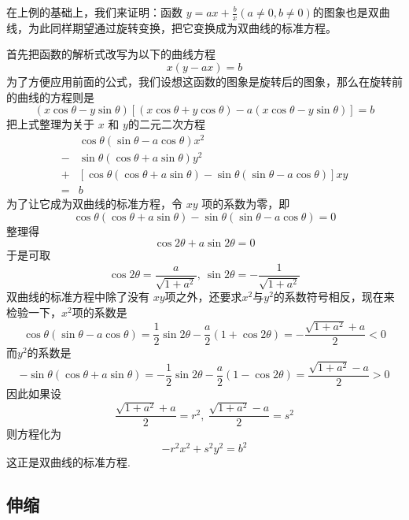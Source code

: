 \begin{example}
  在上例的基础上，我们来证明：函数 $y=ax+\frac{b}{x}(a \neq 0, b \neq 0)$的图象也是双曲线，为此同样期望通过旋转变换，把它变换成为双曲线的标准方程。

  首先把函数的解析式改写为以下的曲线方程
  \[ x(y-ax)=b \]
  为了方便应用前面的公式，我们设想这函数的图象是旋转后的图象，那么在旋转前的曲线的方程则是
  \[ (x\cos{\theta}-y\sin{\theta})[(x\cos{\theta}+y\cos{\theta})-a(x\cos{\theta}-y\sin{\theta})]=b \]
  把上式整理为关于 $x$ 和 $y$的二元二次方程
  \begin{equation*}
    \begin{split}
      & \cos{\theta}(\sin{\theta}-a\cos{\theta})x^2 \\
      - & \sin{\theta}(\cos{\theta}+a\sin{\theta})y^2 \\
      + & [\cos{\theta}(\cos{\theta}+a\sin{\theta})-\sin{\theta}(\sin{\theta}-a\cos{\theta})]xy \\
      = & b
    \end{split}
  \end{equation*}
  为了让它成为双曲线的标准方程，令 $xy$ 项的系数为零，即
  \[ \cos{\theta}(\cos{\theta}+a\sin{\theta})-\sin{\theta}(\sin{\theta}-a\cos{\theta}) = 0 \]
  整理得
  \[ \cos{2\theta}+a\sin{2\theta}=0 \]
  于是可取
  \[ \cos{2\theta} = \frac{a}{\sqrt{1+a^2}}, \  \sin{2\theta}=-\frac{1}{\sqrt{1+a^2}} \]
  双曲线的标准方程中除了没有 $xy$项之外，还要求$x^2$与$y^2$的系数符号相反，现在来检验一下，$x^2$项的系数是
  \[ \cos{\theta}(\sin{\theta}-a\cos{\theta})=\frac{1}{2}\sin{2\theta}-\frac{a}{2}(1+\cos{2\theta}) = -\frac{\sqrt{1+a^2}+a}{2}<0 \]
  而$y^2$的系数是
  \[ -\sin{\theta}(\cos{\theta}+a\sin{\theta})=-\frac{1}{2}\sin{2\theta}-\frac{a}{2}(1-\cos{2\theta})=\frac{\sqrt{1+a^2}-a}{2}>0 \]
  因此如果设
  \[\frac{\sqrt{1+a^2}+a}{2}=r^2, \  \frac{\sqrt{1+a^2}-a}{2}=s^2 \]
  则方程化为
  \[ -r^2x^2+s^2y^2=b^2 \]
  这正是双曲线的标准方程.
\end{example}

\subsection{伸缩}

